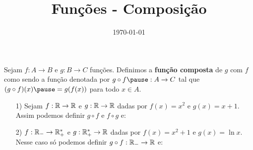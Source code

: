 \documentclass{beamer}
\title{Fun\c{c}\~oes - Composição}
\author[\autor]{\autor}
\institute[\instituto]{\instituto}
\date{\today}
\begin{document}
    \begin{frame}
        \maketitle
    \end{frame}


    \begin{frame}
        \begin{definicao}
            Sejam $f : A \to B$ \pause e $g : B \to C$ \pause fun\c{c}\~oes. \pause Definimos a \textbf{fun\c{c}\~ao composta} \pause de $g$ com $f$ \pause como sendo a fun\c{c}\~ao denotada por $g \circ f \pause : A \to C$ \pause tal que \pause $(g\circ f)(x) \pause = g(f(x))$ \pause para todo $x \in A$.\pause
        \end{definicao}

        \vspace{5cm}
    \end{frame}

    \begin{frame}
        \begin{exemplos}
            \begin{enumerate}
                \item[1)] Sejam $f : \mathbb{R} \to \mathbb{R}$ \pause e $g : \mathbb{R} \to \mathbb{R}$ \pause dadas por $f(x) = x^2$ \pause e $g(x) = x + 1$. \pause Assim podemos definir $g \circ f$ \pause e $f \circ g$ e:\pause
            \end{enumerate}
        \end{exemplos}

        \vspace{5cm}
    \end{frame}
    
    \begin{frame}
        \vspace{5cm}    
    \end{frame}

    \begin{frame}
        \begin{exemplos}
            \begin{enumerate}
                \item[2)] $f : \mathbb{R}_- \to \mathbb{R}^*_+$ \pause e $g : \mathbb{R}^*_+ \to \mathbb{R}$ \pause dadas por $f(x) = x^2 + 1$ \pause e $g(x) = \ln x$. \pause Nesse caso s\'o podemos definir $g \circ f : \mathbb{R}_- \to \mathbb{R}$ e:\pause
            \end{enumerate}
        \end{exemplos}

        \vspace{5cm}
    \end{frame}
\end{document}
